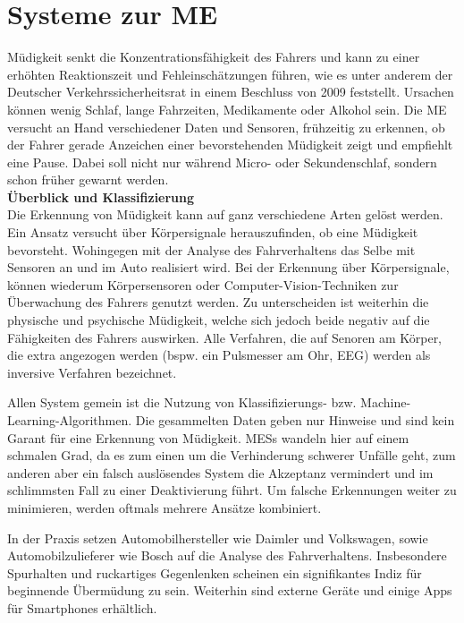 {\section{Systeme zur \acl{ME}}
\label{chap:me}
Müdigkeit senkt die Konzentrationsfähigkeit des Fahrers und kann zu einer erhöhten Reaktionszeit und Fehleinschätzungen führen, wie es unter anderem der Deutscher Verkehrssicherheitsrat in einem Beschluss von 2009 \cite{DVR:Online} feststellt. Ursachen können wenig Schlaf, lange Fahrzeiten, Medikamente oder Alkohol sein.
Die \acl{ME} versucht an Hand verschiedener Daten und Sensoren, frühzeitig zu erkennen, ob der Fahrer gerade Anzeichen einer bevorstehenden Müdigkeit zeigt und empfiehlt eine Pause.
Dabei soll nicht nur während Micro- oder Sekundenschlaf, sondern schon früher gewarnt werden. \\

\textbf{Überblick und Klassifizierung} \\
Die Erkennung von Müdigkeit kann auf ganz verschiedene Arten gelöst werden. Ein Ansatz versucht über Körpersignale herauszufinden, ob eine Müdigkeit bevorsteht. Wohingegen mit der Analyse des Fahrverhaltens das Selbe mit Sensoren an und im Auto realisiert wird.
Bei der Erkennung über Körpersignale, können wiederum Körpersensoren oder Computer-Vision-Techniken zur Überwachung des Fahrers genutzt werden. Zu unterscheiden ist weiterhin die physische und psychische Müdigkeit, welche sich jedoch beide negativ auf die Fähigkeiten des Fahrers auswirken. Alle Verfahren, die auf Senoren am Körper, die extra angezogen werden (bspw. ein Pulsmesser am Ohr, EEG) werden als inversive Verfahren bezeichnet.

Allen System gemein ist die Nutzung von Klassifizierungs- bzw. Machine-Learning-Algorithmen. Die gesammelten Daten geben nur Hinweise und sind kein Garant für eine Erkennung von Müdigkeit. \acl{MESs} wandeln hier auf einem schmalen Grad, da es zum einen um die Verhinderung schwerer Unfälle geht, zum anderen aber ein falsch auslösendes System die Akzeptanz vermindert und im schlimmsten Fall zu einer Deaktivierung führt. Um falsche Erkennungen weiter zu minimieren, werden oftmals mehrere Ansätze kombiniert.

In der Praxis setzen Automobilhersteller wie Daimler \cite{Daimler} und Volkswagen, sowie Automobilzulieferer wie Bosch \cite{Bosch} auf die Analyse des Fahrverhaltens. Insbesondere Spurhalten und ruckartiges Gegenlenken scheinen ein signifikantes Indiz für beginnende Übermüdung zu sein. Weiterhin sind externe Geräte und einige Apps für Smartphones erhältlich. \\

}
